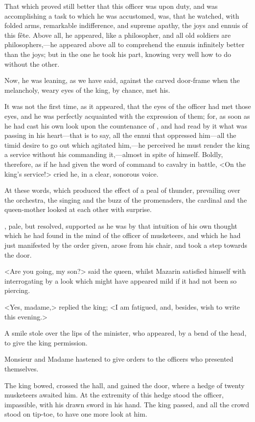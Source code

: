 That which proved still better that this officer was upon duty, and was accomplishing a task to which he was accustomed, was, that he watched, with folded arms, remarkable indifference, and supreme apathy, the joys and ennuis of this fête. Above all, he appeared, like a philosopher, and all old soldiers are philosophers,—he appeared above all to comprehend the ennuis infinitely better than the joys; but in the one he took his part, knowing very well how to do without the other.

Now, he was leaning, as we have said, against the carved door-frame when the melancholy, weary eyes of the king, by chance, met his.

It was not the first time, as it appeared, that the eyes of the officer had met those eyes, and he was perfectly acquainted with the expression of them; for, as soon as he had cast his own look upon the countenance of , and had read by it what was passing in his heart—that is to say, all the ennui that oppressed him—all the timid desire to go out which agitated him,—he perceived he must render the king a service without his commanding it,—almost in spite of himself. Boldly, therefore, as if he had given the word of command to cavalry in battle, <On the king's service!> cried he, in a clear, sonorous voice.

At these words, which produced the effect of a peal of thunder, prevailing over the orchestra, the singing and the buzz of the promenaders, the cardinal and the queen-mother looked at each other with surprise.

, pale, but resolved, supported as he was by that intuition of his own thought which he had found in the mind of the officer of musketeers, and which he had just manifested by the order given, arose from his chair, and took a step towards the door.

<Are you going, my son?> said the queen, whilst Mazarin satisfied himself with interrogating by a look which might have appeared mild if it had not been so piercing.

<Yes, madame,> replied the king; <I am fatigued, and, besides, wish to write this evening.>

A smile stole over the lips of the minister, who appeared, by a bend of the head, to give the king permission.

Monsieur and Madame hastened to give orders to the officers who presented themselves.

The king bowed, crossed the hall, and gained the door, where a hedge of twenty musketeers awaited him. At the extremity of this hedge stood the officer, impassible, with his drawn sword in his hand. The king passed, and all the crowd stood on tip-toe, to have one more look at him.

